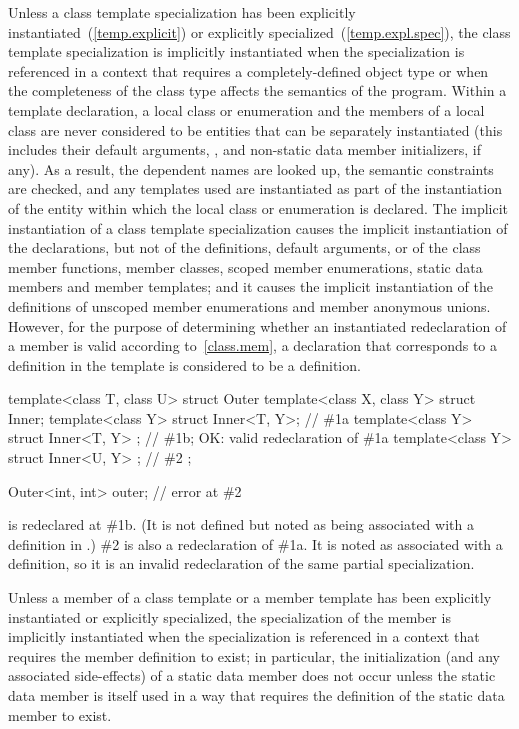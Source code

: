 \pnum
{}%
Unless a class template specialization has been explicitly
instantiated~(\ref{temp.explicit}) or explicitly
specialized~(\ref{temp.expl.spec}),
the class template specialization is implicitly instantiated when the
specialization is referenced in a context that requires a completely-defined
object type or when the completeness of the class type affects the semantics
of the program.
\enternote
Within a template declaration, a local class or enumeration and the members of
a local class are never considered to be entities that can be separately
instantiated (this includes their default arguments,
, and non-static data member
initializers, if any). As a result, the dependent names are looked up, the
semantic constraints are checked, and any templates used are instantiated as
part of the instantiation of the entity within which the local class or
enumeration is declared.
\exitnote
The implicit instantiation of a class template specialization causes
the implicit instantiation of the declarations, but not of the definitions,
default arguments, or  of the class member functions,
member classes, scoped member enumerations, static data members and member templates; and it causes the
implicit instantiation of the definitions of unscoped member enumerations and member anonymous unions.
However, for the purpose of determining whether an instantiated redeclaration
of a member is valid according to~\ref{class.mem}, a declaration that
corresponds to a definition in the template is considered to be a
definition.
\enterexample
\begin{codeblock}
template<class T, class U>
struct Outer {
  template<class X, class Y> struct Inner;
  template<class Y> struct Inner<T, Y>;         // \#1a
  template<class Y> struct Inner<T, Y> { };     // \#1b; OK: valid redeclaration of \#1a
  template<class Y> struct Inner<U, Y> { };     // \#2
};

Outer<int, int> outer;                          // error at \#2
\end{codeblock}

 is redeclared at \#1b. (It is not defined
but noted as being associated with a definition in .) \#2
is also a redeclaration of \#1a. It is noted as associated with a definition,
so it is an invalid redeclaration of the same partial specialization.
\exitexample

\pnum
Unless a member of a class template or a member template has been explicitly
instantiated or explicitly specialized,
the specialization of the member is implicitly instantiated when the
specialization is referenced in a context that requires the member definition
to exist;
in particular, the initialization (and any associated side-effects) of a
static data member does not occur unless the static data member is itself used
in a way that requires the definition of the static data member to exist.

